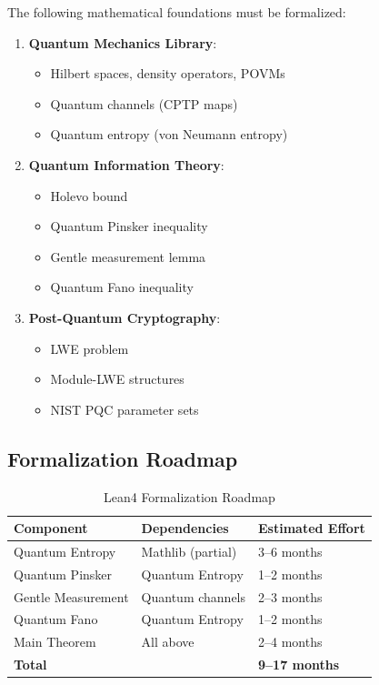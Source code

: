 \documentclass{ieeeaccess}
\begin{document}
The following mathematical foundations must be formalized:

\begin{enumerate}
    \item \textbf{Quantum Mechanics Library}:
    \begin{itemize}
        \item Hilbert spaces, density operators, POVMs
        \item Quantum channels (CPTP maps)
        \item Quantum entropy (von Neumann entropy)
    \end{itemize}

    \item \textbf{Quantum Information Theory}:
    \begin{itemize}
        \item Holevo bound
        \item Quantum Pinsker inequality
        \item Gentle measurement lemma
        \item Quantum Fano inequality
    \end{itemize}

    \item \textbf{Post-Quantum Cryptography}:
    \begin{itemize}
        \item LWE problem
        \item Module-LWE structures
        \item NIST PQC parameter sets
    \end{itemize}
\end{enumerate}

\subsection{Formalization Roadmap}

\begin{table}[h]
\centering
\caption{Lean4 Formalization Roadmap}
\label{tab:lean4_roadmap}
\setlength{\tabcolsep}{3pt}
\begin{tabular}{p{2.5cm}p{3cm}p{2.8cm}}
\toprule
\textbf{Component} & \textbf{Dependencies} & \textbf{Estimated Effort} \\
\midrule
Quantum Entropy & Mathlib (partial) & 3--6 months \\
Quantum Pinsker & Quantum Entropy & 1--2 months \\
Gentle Measurement & Quantum channels & 2--3 months \\
Quantum Fano & Quantum Entropy & 1--2 months \\
Main Theorem & All above & 2--4 months \\
\midrule
\textbf{Total} & & \textbf{9--17 months} \\
\bottomrule
\end{tabular}
\end{table}
\end{document}
